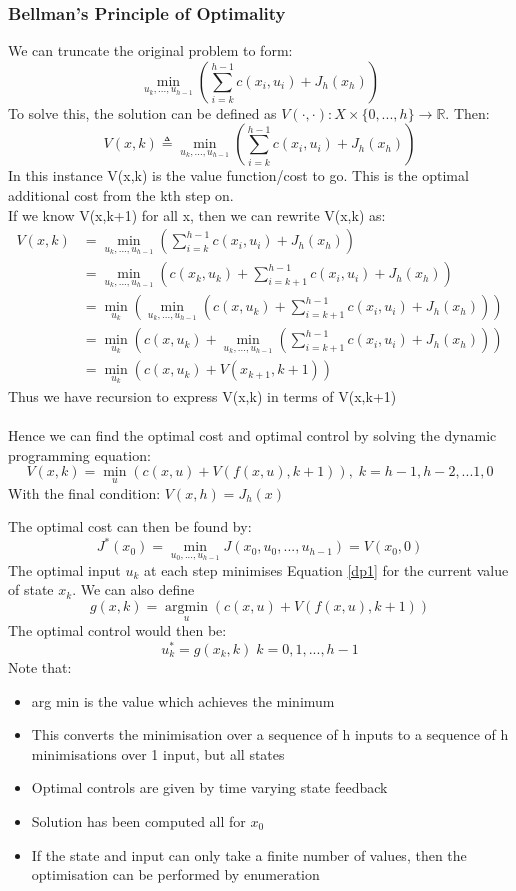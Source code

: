 \documentclass{article}
\begin{document}
\subsubsection*{Bellman's Principle of Optimality}
We can truncate the original problem to form:
\[
\min_{u_k,...,u_{h-1}} \left(\sum_{i=k}^{h-1} c(x_i,u_i) + J_h(x_h) \right)
\]
To solve this, the solution can be defined as $V(\cdot, \cdot) : X \times \{0,...,h\} \rightarrow \mathbb{R}$. Then:
\[
V(x,k) \triangleq \min_{u_k,...,u_{h-1}} \left( \sum_{i=k}^{h-1} c(x_i,u_i) + J_h(x_h) \right)
\]
In this instance V(x,k) is the value function/cost to go. This is the optimal additional cost from the kth step on. \\ If we know V(x,k+1) for all x, then we can rewrite V(x,k) as:
\[
\begin{aligned}
V(x,k) &= \min_{u_k,...,u_{h-1}} \left( \sum_{i=k}^{h-1} c(x_i,u_i) + J_h(x_h) \right) \\ &= \min_{u_k,...,u_{h-1}} \left( c(x_k,u_k) + \sum_{i=k+1}^{h-1} c(x_i,u_i) + J_h(x_h) \right) \\ &= \min_{u_k} \left( \min_{u_k,...,u_{h-1}} \left( c(x,u_k) + \sum_{i=k+1}^{h-1} c(x_i,u_i) + J_h(x_h)\right)  \right) \\
&= \min_{u_k} \left( c(x,u_k) + \min_{u_k,...,u_{h-1}} \left( \sum_{i=k+1}^{h-1} c(x_i,u_i) + J_h(x_h) \right) \right)
\\ 
&= \min_{u_k} \left( c(x,u_k) + V(x_{k+1},k+1) \right)
\end{aligned}
\]
Thus we have recursion to express V(x,k) in terms of V(x,k+1) \\ \\
Hence we can find the optimal cost and optimal control by solving the dynamic programming equation: 
\begin{equation}\label{dp1}
V(x,k) = \min_u (c(x,u) + V(f(x,u),k+1)), \; k=h-1,h-2,...1,0
\end{equation}
With the final condition: $V(x,h) = J_h(x)$

The optimal cost can then be found by:
\[
J^*(x_0) = \min_{u_0,...,u_{h-1}} J(x_0,u_0,...,u_{h-1}) = V(x_0,0)
\]
The optimal input $u_k$ at each step minimises Equation \eqref{dp1} for the current value of state $x_k$. We can also define 
\[
g(x,k) = \operatorname*{argmin}_u (c(x,u) + V(f(x,u),k+1))
\]
The optimal control would then be:
\[
u_k^* = g(x_k,k) \; k=0,1,...,h-1
\]
Note that:
\begin{itemize}
    \item arg min is the value which achieves the minimum
    \item This converts the minimisation over a sequence of h inputs to a sequence of h minimisations over 1 input, but all states
    \item Optimal controls are given by time varying state feedback
    \item Solution has been computed all for $x_0$
    \item If the state and input can only take a finite number of values, then the optimisation can be performed by enumeration
\end{itemize}
\end{document}
